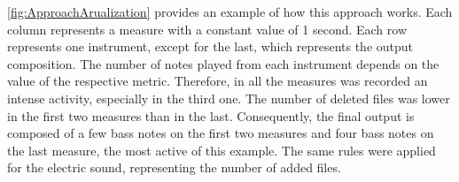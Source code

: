 \autoref{fig:ApproachArualization} provides an example of how this approach works. Each column represents a measure with a constant value of 1 second. Each row represents one instrument, except for the last, which represents the output composition. The number of notes played from each instrument depends on the value of the respective metric. Therefore, in all the measures was recorded an intense activity, especially in the third one. The number of deleted files was lower in the first two measures than in the last. Consequently, the final output is composed of a few bass notes on the first two measures and four bass notes on the last measure, the most active of this example. The same rules were applied for the electric sound, representing the number of added files.    

